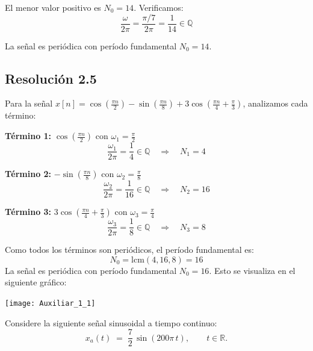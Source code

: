 \documentclass[
  11pt,
  letterpaper,
   addpoints,
   answers
  ]{exam}
\begin{document}
\begin{questions}
\begin{solution}
El menor valor positivo es $N_0 = 14$. Verificamos:
\begin{equation}
\frac{\omega}{2\pi} = \frac{\pi/7}{2\pi} = \frac{1}{14} \in \mathbb{Q}
\end{equation}

La señal es periódica con período fundamental $\boxed{N_0 = 14}$.

\subsection*{Resolución 2.5}

Para la señal $x[n] = \cos\!\left(\tfrac{\pi n}{2}\right) - \sin\!\left(\tfrac{\pi n}{8}\right) + 3\cos\!\left(\tfrac{\pi n}{4}+\tfrac{\pi}{3}\right)$, analizamos cada término:

\textbf{Término 1:} $\cos\!\left(\tfrac{\pi n}{2}\right)$ con $\omega_1 = \frac{\pi}{2}$
\begin{equation}
\frac{\omega_1}{2\pi} = \frac{1}{4} \in \mathbb{Q} \quad \Rightarrow \quad N_1 = 4
\end{equation}

\textbf{Término 2:} $-\sin\!\left(\tfrac{\pi n}{8}\right)$ con $\omega_2 = \frac{\pi}{8}$
\begin{equation}
\frac{\omega_2}{2\pi} = \frac{1}{16} \in \mathbb{Q} \quad \Rightarrow \quad N_2 = 16
\end{equation}

\textbf{Término 3:} $3\cos\!\left(\tfrac{\pi n}{4}+\tfrac{\pi}{3}\right)$ con $\omega_3 = \frac{\pi}{4}$
\begin{equation}
\frac{\omega_3}{2\pi} = \frac{1}{8} \in \mathbb{Q} \quad \Rightarrow \quad N_3 = 8
\end{equation}

Como todos los términos son periódicos, el período fundamental es:
\begin{equation}
N_0 = \text{lcm}(4, 16, 8) = 16
\end{equation}
La señal es periódica con período fundamental $\boxed{N_0 = 16}$. Esto se visualiza en el siguiente gráfico:
\begin{center}
  \texttt{[image: Auxiliar\_1\_1]}
\end{center}

\end{solution}

\question Considere la siguiente señal sinusoidal a tiempo continuo:
\begin{equation}
  x_a(t) \;=\; \frac{7}{2}\,\sin(200\pi\,t), 
  \qquad t \in \mathbb{R}.
\end{equation}


\end{questions}
\end{document}

